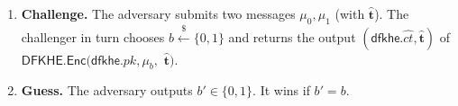 \documentclass[runningheads,10pt]{llncs}
\begin{document}
\begin{enumerate}
	\item \textbf{Challenge.} 
	The adversary submits two messages $\mu_0, \mu_1$ (with $\widehat{\mathbf{t}}$). The challenger in turn chooses $b \xleftarrow{\$} \{0,1\}$ and 
	returns the output $(\mathsf{dfkhe}.\widehat{ct}, \widehat{\mathbf{t}})$ of $ \textsf{DFKHE.Enc}(\mathsf{dfkhe}.pk,\mu_b, $ $\widehat{\mathbf{t}})$.  
			\item \textbf{Guess.} The adversary outputs $b'\in \{0,1\}$. It wins if $b'=b$. 
\end{enumerate}

\iffalse
\end{document}
